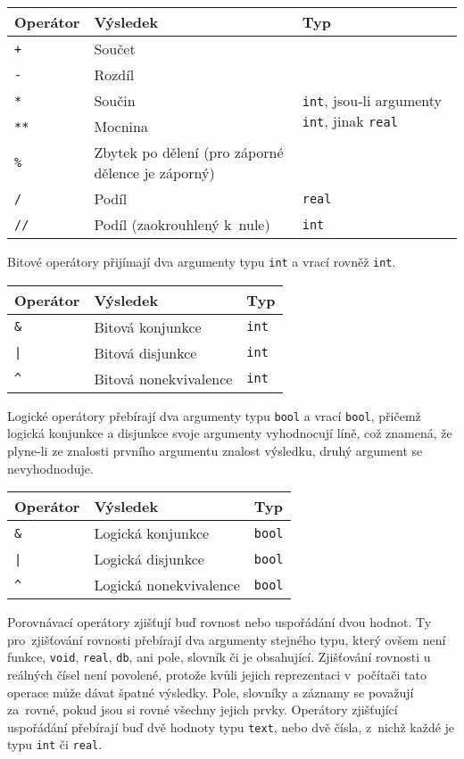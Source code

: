 \documentclass[a4paper,12pt]{article}
\begin{document}
\begin{tabular}{|m{1.5cm} m{5cm} m{8cm}|}\hline
Operátor & Výsledek & Typ\\\hline
\texttt{+} & Součet & \multirow{5}{*}{\texttt{int}, jsou-li argumenty \texttt{int}, jinak \texttt{real}}\\
\texttt{-} & Rozdíl & \\
\texttt{*} & Součin & \\
\texttt{**} & Mocnina & \\
\texttt{\%} & Zbytek po dělení (pro záporné dělence je záporný) & \\\hline
\texttt{/} & Podíl & \texttt{real}\\\hline
\texttt{//} & Podíl (zaokrouhlený k~nule) & \texttt{int}\\\hline
\end{tabular}

Bitové operátory přijímají dva argumenty typu \texttt{int} a vrací rovněž \texttt{int}.

\begin{tabular}{|m{1.5cm} m{5cm} m{8cm}|}\hline
Operátor & Výsledek & Typ\\\hline
\texttt{\&} & Bitová konjunkce & \texttt{int}\\\hline
\texttt{|} & Bitová disjunkce & \texttt{int}\\\hline
\texttt{\^} & Bitová nonekvivalence & \texttt{int}\\\hline
\end{tabular}

Logické operátory přebírají dva argumenty typu \texttt{bool} a vrací \texttt{bool}, přičemž logická konjunkce a disjunkce svoje argumenty vyhodnocují líně, což znamená, že plyne-li ze znalosti prvního argumentu znalost výsledku, druhý argument se nevyhodnoduje.

\begin{tabular}{|m{1.5cm} m{5cm} m{8cm}|}\hline
Operátor & Výsledek & Typ\\\hline
\texttt{\&} & Logická konjunkce & \texttt{bool}\\\hline
\texttt{|} & Logická disjunkce & \texttt{bool}\\\hline
\texttt{\^} & Logická nonekvivalence & \texttt{bool}\\\hline
\end{tabular}

Porovnávací operátory zjišťují buď rovnost nebo uspořádání dvou hodnot. Ty pro~zjišťování rovnosti přebírají dva argumenty stejného typu, který ovšem není funkce, \texttt{void}, \texttt{real}, \texttt{db}, ani pole, slovník či je obsahující. Zjišťování rovnosti u reálných čísel není povolené, protože kvůli jejich reprezentaci v~počítači tato operace může dávat špatné výsledky. Pole, slovníky a záznamy se považují za~rovné, pokud jsou si rovné všechny jejich prvky. Operátory zjišťující uspořádání přebírají buď dvě hodnoty typu \texttt{text}, nebo dvě čísla, z~nichž každé je typu \texttt{int} či \texttt{real}.
\end{document}
